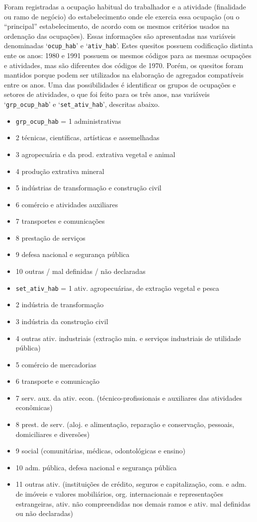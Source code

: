 \documentclass[12pt,a4paper]{article}
\newcommand{\vr}[1]{\texttt{#1}}
\begin{document}
Foram registradas a ocupação habitual do trabalhador e a atividade (finalidade ou ramo de negócio) do estabelecimento onde ele exercia essa ocupação (ou o “principal” estabelecimento, de acordo com os mesmos critérios usados na ordenação das ocupações). Essas informações são apresentadas nas variáveis denominadas ‘\vr{ocup\_hab}’ e ‘\vr{ativ\_hab}’. Estes quesitos possuem codificação distinta ente os anos: 1980 e 1991 possuem os mesmos códigos para as mesmas ocupações e atividades, mas são diferentes dos códigos de 1970. Porém, os quesitos foram mantidos porque podem ser utilizados na elaboração de agregados compatíveis entre os anos. Uma das possibilidades é identificar os grupos de ocupações e setores de atividades, o que foi feito para os três anos, nas variáveis ‘\vr{grp\_ocup\_hab}’ e ‘\vr{set\_ativ\_hab}’, descritas abaixo.
\begin{itemize}
  \item \vr{grp\_ocup\_hab} = 1 administrativas
  \item 2 técnicas, científicas, artísticas e assemelhadas
  \item 3 agropecuária e da prod. extrativa vegetal e animal
  \item 4 produção extrativa mineral
  \item 5 indústrias de transformação e construção civil
  \item 6 comércio e atividades auxiliares
  \item 7 transportes e comunicações
  \item 8 prestação de serviços
  \item 9 defesa nacional e segurança pública
  \item 10 outras / mal definidas / não declaradas
  \item \vr{set\_ativ\_hab} = 1 ativ. agropecuárias, de extração vegetal e pesca
  \item 2 indústria de transformação
  \item 3 indústria da construção civil
  \item 4 outras ativ. industriais (extração min. e serviços industriais de utilidade pública)
  \item 5 comércio de mercadorias
  \item 6 transporte e comunicação
  \item 7 serv. aux. da ativ. econ. (técnico-profissionais e auxiliares das atividades econômicas)
  \item 8 prest. de serv. (aloj. e alimentação, reparação e conservação, pessoais, domiciliares e diversões)
  \item 9 social (comunitárias, médicas, odontológicas e ensino)
  \item 10 adm. pública, defesa nacional e segurança pública
  \item 11 outras ativ. (instituições de crédito, seguros e capitalização, com. e adm. de imóveis e valores mobiliários, org. internacionais e representações estrangeiras, ativ. não compreendidas nos demais ramos e ativ. mal definidas ou não declaradas)
\end{itemize}
\end{document}
